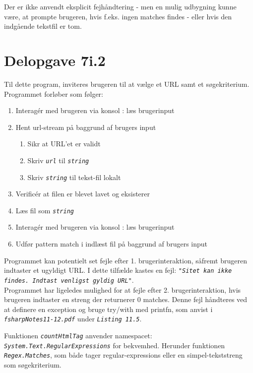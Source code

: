 \documentclass[a4paper,10pt]{article}
\begin{document}
Der er ikke anvendt eksplicit fejhåndtering - men en mulig udbygning kunne være, at prompte brugeren, hvis f.eks. ingen matches findes - eller hvis den indgående tekstfil er tom. 

\section{Delopgave 7i.2}
Til dette program, inviteres brugeren til at vælge et URL samt et søgekriterium. Programmet forløber som følger:

\begin{enumerate}
\item Interagér med brugeren via konsol : læs brugerinput
\item Hent url-stream på baggrund af brugers input
\begin{enumerate}
\item Sikr at URL'et er validt
\item Skriv \texttt{\textit{url}} til \texttt{\textit{string}}
\item Skriv \texttt{\textit{string}} til tekst-fil lokalt
\end{enumerate}
\item Verificér at filen er blevet lavet og eksisterer
\item Læs fil som \texttt{\textit{string}}
\item Interagér med brugeren via konsol : læs brugerinput
\item Udfør pattern match i indlæst fil på baggrund af brugers input
\end{enumerate}

\noindent Programmet kan potentielt set fejle efter 1. brugerinteraktion, såfremt brugeren indtaster et ugyldigt URL. I dette tilfælde kastes en fejl: \texttt{\textit{"Sitet kan ikke findes. Indtast venligst gyldig URL"}}. \\

\noindent Programmet har ligeledes mulighed for at fejle efter 2. brugerinteraktion, hvis brugeren indtaster en streng der returnerer 0 matches. Denne fejl håndteres ved at definere en exception og bruge try/with med printfn, som anvist i \texttt{\textit{fsharpNotes11-12.pdf}} under \texttt{\textit{Listing 11.5}}. \newline

\noindent Funktionen \texttt{\textit{countHtmlTag}} anvender namespacet: \texttt{\textit{System.Text.RegularExpressions}} for bekvemhed. Herunder funktionen \texttt{\textit{Regex.Matches}}, som både tager regular-expressions eller en simpel-tekststreng som søgekriterium. 
\end{document}
